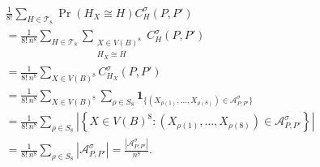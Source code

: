 \documentclass[11pt]{article}
\newcommand{\ind}{\mathbf 1}
\begin{document}
\begin{align*}
&\frac1{8!}\sum_{H\in\mathcal T_8}\Pr(H_X\cong H)C_H^\sigma(P,P')\\
&=\frac1{8!\,n^8}\sum_{H\in\mathcal T_8}
\sum_{\substack{X\in V(B)^8\\H_X\cong H}}C_H^\sigma(P,P')\\
&=\frac1{8!\,n^8}\sum_{X\in V(B)^8}C_{H_X}^\sigma(P,P')\\
&=\frac1{8!\,n^8}\sum_{X\in V(B)^8}\sum_{\rho\in S_8}
\ind_{\{(X_{\rho(1)},\ldots,X_{\rho(8)})\in\mathcal A^\sigma_{P,P'}\}}\\
&=\frac1{8!\,n^8}\sum_{\rho\in S_8}
\left|\left\{X\in V(B)^8:
(X_{\rho(1)},\ldots,X_{\rho(8)})\in\mathcal A^\sigma_{P,P'}\right\}\right|\\
&=\frac1{8!\,n^8}\sum_{\rho\in S_8}|\mathcal A^\sigma_{P,P'}|
=\frac{|\mathcal A^\sigma_{P,P'}|}{n^8}.
\end{align*}
\end{document}
